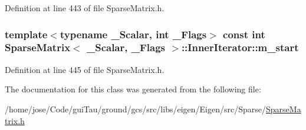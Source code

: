 Definition at line 443 of file Sparse\-Matrix.\-h.

\hypertarget{class_sparse_matrix_1_1_inner_iterator_ab921abc4c659845a3e19479047ab56c0}{
\subsubsection[{m\-\_\-start}]{\setlength{\rightskip}{0pt plus 5cm}template$<$typename \-\_\-\-Scalar, int \-\_\-\-Flags$>$ const {\bf int} {\bf Sparse\-Matrix}$<$ \-\_\-\-Scalar, \-\_\-\-Flags $>$\-::Inner\-Iterator\-::m\-\_\-start\hspace{0.3cm}{\ttfamily [protected]}}}\label{class_sparse_matrix_1_1_inner_iterator_ab921abc4c659845a3e19479047ab56c0}


Definition at line 445 of file Sparse\-Matrix.\-h.



The documentation for this class was generated from the following file\-:\begin{DoxyCompactItemize}
\item 
/home/jose/\-Code/gui\-Tau/ground/gcs/src/libs/eigen/\-Eigen/src/\-Sparse/\hyperlink{_sparse_matrix_8h}{Sparse\-Matrix.\-h}\end{DoxyCompactItemize}
